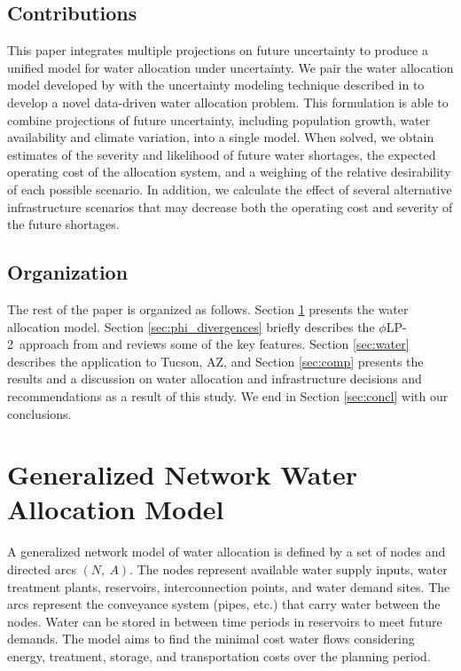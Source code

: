 \documentclass[opre,nonblindrev]{informs3} %
\newcommand{\plp}{$\phi$LP-2}
\begin{document}
\subsection{Contributions}

This paper integrates multiple projections on future uncertainty to produce a unified model for water allocation under uncertainty.
We pair the water allocation model developed by \cite{woods2012centralized} with the uncertainty modeling technique described in \citep{love2013phi} to develop a novel data-driven water allocation problem.
This formulation is able to combine projections of future uncertainty, including population growth, water availability and climate variation, into a single model.
When solved, we obtain estimates of the severity and likelihood of future water shortages, the expected operating cost of the allocation system, and a weighing of the relative desirability of each possible scenario.
In addition, we calculate the effect of several alternative infrastructure scenarios that may decrease both the operating cost and severity of the future shortages.

\subsection{Organization}

The rest of the paper is organized as follows.
Section \ref{sec:network_model} presents the water allocation model.
Section \ref{sec:phi_divergences} briefly describes the \plp\ approach from \citep{love2013phi} and reviews some of the key features.
Section \ref{sec:water} describes the application to Tucson, AZ, and Section \ref{sec:comp} presents the results and a discussion on water allocation and infrastructure decisions and recommendations as a result of this study.
We end in Section \ref{sec:concl} with our conclusions.



\section{Generalized Network Water Allocation Model}
\label{sec:network_model}

A generalized network model of water allocation is defined by a set of nodes and directed arcs $(N,\: A)$.
The nodes represent available water supply inputs, water treatment plants, reservoirs, interconnection points, and water demand sites.
The arcs represent the conveyance system (pipes, etc.) that carry water between the nodes.
Water can be stored in between time periods in reservoirs to meet future demands.
The model aims to find the minimal cost water flows considering energy, treatment, storage, and transportation costs over the planning period.
\end{document}
